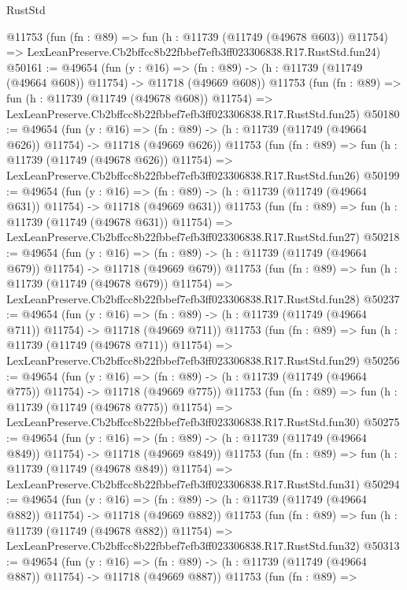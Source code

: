\begin{lexlean}{RustStd}
\begin{coremodule}
    @11753
    (fun (fn : @89) =>
    fun (h : @11739 (@11749 (@49678 @603)) @11754) =>
    LexLeanPreserve.Cb2bffcc8b22fbbef7efb3ff023306838.R17.RustStd.fun24)
@50161 := @49654
    (fun (y : @16) =>
    (fn : @89) -> (h : @11739 (@11749 (@49664 @608)) @11754) -> @11718 (@49669 @608))
    @11753
    (fun (fn : @89) =>
    fun (h : @11739 (@11749 (@49678 @608)) @11754) =>
    LexLeanPreserve.Cb2bffcc8b22fbbef7efb3ff023306838.R17.RustStd.fun25)
@50180 := @49654
    (fun (y : @16) =>
    (fn : @89) -> (h : @11739 (@11749 (@49664 @626)) @11754) -> @11718 (@49669 @626))
    @11753
    (fun (fn : @89) =>
    fun (h : @11739 (@11749 (@49678 @626)) @11754) =>
    LexLeanPreserve.Cb2bffcc8b22fbbef7efb3ff023306838.R17.RustStd.fun26)
@50199 := @49654
    (fun (y : @16) =>
    (fn : @89) -> (h : @11739 (@11749 (@49664 @631)) @11754) -> @11718 (@49669 @631))
    @11753
    (fun (fn : @89) =>
    fun (h : @11739 (@11749 (@49678 @631)) @11754) =>
    LexLeanPreserve.Cb2bffcc8b22fbbef7efb3ff023306838.R17.RustStd.fun27)
@50218 := @49654
    (fun (y : @16) =>
    (fn : @89) -> (h : @11739 (@11749 (@49664 @679)) @11754) -> @11718 (@49669 @679))
    @11753
    (fun (fn : @89) =>
    fun (h : @11739 (@11749 (@49678 @679)) @11754) =>
    LexLeanPreserve.Cb2bffcc8b22fbbef7efb3ff023306838.R17.RustStd.fun28)
@50237 := @49654
    (fun (y : @16) =>
    (fn : @89) -> (h : @11739 (@11749 (@49664 @711)) @11754) -> @11718 (@49669 @711))
    @11753
    (fun (fn : @89) =>
    fun (h : @11739 (@11749 (@49678 @711)) @11754) =>
    LexLeanPreserve.Cb2bffcc8b22fbbef7efb3ff023306838.R17.RustStd.fun29)
@50256 := @49654
    (fun (y : @16) =>
    (fn : @89) -> (h : @11739 (@11749 (@49664 @775)) @11754) -> @11718 (@49669 @775))
    @11753
    (fun (fn : @89) =>
    fun (h : @11739 (@11749 (@49678 @775)) @11754) =>
    LexLeanPreserve.Cb2bffcc8b22fbbef7efb3ff023306838.R17.RustStd.fun30)
@50275 := @49654
    (fun (y : @16) =>
    (fn : @89) -> (h : @11739 (@11749 (@49664 @849)) @11754) -> @11718 (@49669 @849))
    @11753
    (fun (fn : @89) =>
    fun (h : @11739 (@11749 (@49678 @849)) @11754) =>
    LexLeanPreserve.Cb2bffcc8b22fbbef7efb3ff023306838.R17.RustStd.fun31)
@50294 := @49654
    (fun (y : @16) =>
    (fn : @89) -> (h : @11739 (@11749 (@49664 @882)) @11754) -> @11718 (@49669 @882))
    @11753
    (fun (fn : @89) =>
    fun (h : @11739 (@11749 (@49678 @882)) @11754) =>
    LexLeanPreserve.Cb2bffcc8b22fbbef7efb3ff023306838.R17.RustStd.fun32)
@50313 := @49654
    (fun (y : @16) =>
    (fn : @89) -> (h : @11739 (@11749 (@49664 @887)) @11754) -> @11718 (@49669 @887))
    @11753
    (fun (fn : @89) =>

\end{coremodule}
\end{lexlean}
